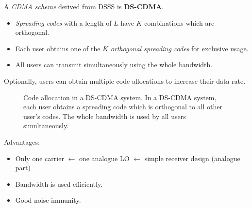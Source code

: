 \begin{refsection}
A \emph{\ac{CDMA} scheme} derived from \ac{DSSS} is  \textbf{\acf{DS-CDMA}}.
\begin{itemize}
	\item \emph{Spreading codes} with a length of $L$ have $K$ combinations which are orthogonal.
	\item Each user obtains one of the $K$ \emph{orthogonal spreading codes} for exclusive usage.
	\item All users can transmit simultaneously using the whole bandwidth.
\end{itemize}

\begin{remark}
	Optionally, users can obtain multiple code allocations to increase their data rate.
\end{remark}

\begin{figure}[H]
	\centering
	\caption[Code allocation in a \acs{DS-CDMA} system]{Code allocation in a \acs{DS-CDMA} system. In a \acs{DS-CDMA} system, each user obtains a spreading code which is orthogonal to all other user's codes. The whole bandwidth is used by all users simultaneously.}
\end{figure}

Advantages:
\begin{itemize}
	\item Only one carrier $\leftarrow$ one analogue \ac{LO} $\leftarrow$ simple receiver design (analogue part)
	\item Bandwidth is used efficiently.
	\item Good noise immunity.
\end{itemize}


\end{refsection}
